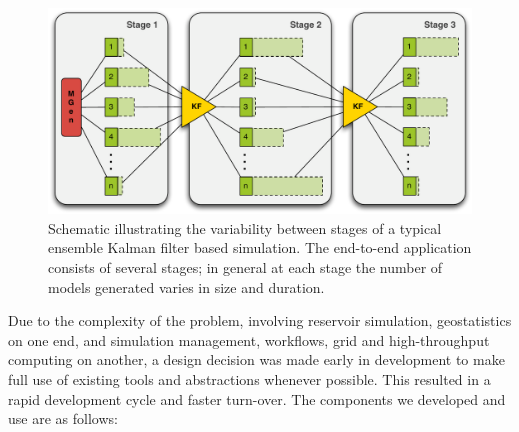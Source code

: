 \documentclass{rspublic}
\begin{document}
\begin{figure}
\begin{center}
\includegraphics*[scale=0.33,angle=0]{figures/3StageKalmanFilter}
\end{center}
\caption{Schematic illustrating the variability between stages of a typical
  ensemble Kalman filter based simulation. The end-to-end
  application consists of several stages; in general at each stage the
  number of models generated varies in size and duration.}
\label{fig:irregular_execution}
\end{figure}

Due to the complexity of the problem, involving reservoir simulation,
geostatistics on one end, and simulation management, workflows, grid
and high-throughput computing on another, a design decision was made
early in development to make full use of existing tools and
abstractions whenever possible. This resulted in a rapid development
cycle and faster turn-over. The components we developed and use are as
follows:
\end{document}
